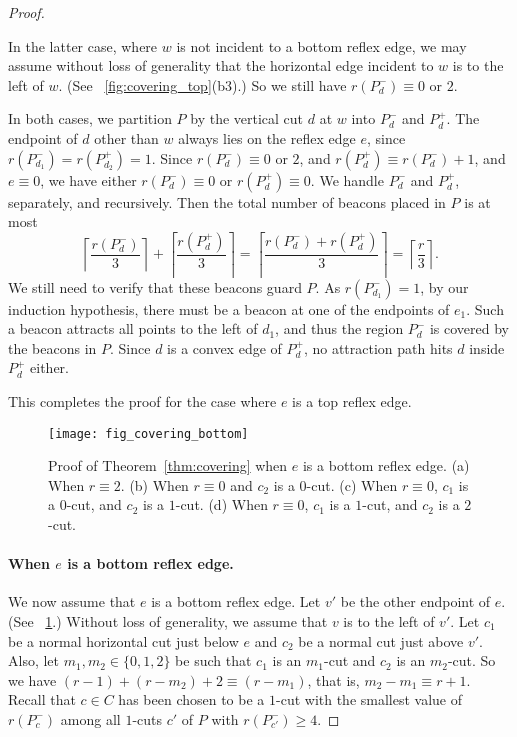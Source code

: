 \documentclass[11pt]{article}
\theoremstyle{definition}
\let\geq\geqslant
\begin{document}
\begin{proof}
\begin{enumerate}[(a)]
\begin{enumerate}[(i)]
 In the latter case, where $w$ is not incident to a bottom reflex edge,
 we may assume without loss of generality that the horizontal edge incident to $w$
 is to the left of $w$. (See \figurename~\ref{fig:covering_top}(b3).)
 So we still have $r(P_d^-) \equiv 0$ or $2$.

 In both cases, we partition $P$ by the vertical cut $d$ at $w$ into $P^-_{d}$ and $P^+_{d}$.
 The endpoint of $d$ other than $w$ always lies on the reflex edge $e$,
 since $r(P^-_{d_1}) = r(P^+_{d_2}) = 1$.
 Since $r(P^-_{d}) \equiv 0$ or $2$, and $r(P^+_{d}) \equiv r(P^-_{d}) + 1$, and
 $e \equiv 0$,
 we have either $r(P^-_{d}) \equiv 0$ or $r(P^+_{d}) \equiv 0$.
 We handle $P^-_{d}$ and $P^+_{d}$, separately, and recursively.
 Then the total number of beacons placed in $P$ is at most
 \[ \left\lceil \frac{r(P^-_{d}) }{3} \right\rceil + \left\lceil \frac{r(P^+_{d}) }{3} \right\rceil
  = \left\lceil \frac{r(P^-_{d}) + r(P^+_{d})}{3} \right\rceil = \left\lceil \frac{r}{3} \right\rceil.\]
 We still need  to verify that these beacons guard $P$.
 As $r(P^-_{d_1})=1$, by our induction hypothesis, there must be a beacon at one of the 
 endpoints of $e_1$.
 Such a beacon attracts all points to the left of $d_1$, and thus
 the region $P^-_{d}$ is covered by the beacons in $P$.
 Since $d$ is a convex edge of $P^+_{d}$, no attraction path hits $d$ inside $P^+_{d}$
 either.
 \end{enumerate}

\end{enumerate}
This completes the proof for the case where $e$ is a top reflex edge.

\begin{figure}[tb]
\centering
\texttt{[image: fig\_covering\_bottom]}
\caption{Proof of Theorem~\ref{thm:covering} when $e$ is a bottom reflex edge.
(a) When $r \equiv 2$.
(b) When $r \equiv 0$ and $c_2$ is a $0$-cut.
(c) When $r \equiv 0$, $c_1$ is a $0$-cut, and $c_2$ is a $1$-cut.
(d) When $r \equiv 0$, $c_1$ is a $1$-cut, and $c_2$ is a $2$-cut. }
\label{fig:covering_bottom}
\end{figure}


\paragraph{When $e$ is a bottom reflex edge.}
We now assume that $e$ is a bottom reflex edge.
Let $v'$ be the other endpoint of $e$. (See \figurename~\ref{fig:covering_bottom}.)
Without loss of generality, we assume that $v$ is to the left of $v'$.
Let $c_1$ be a normal horizontal cut just below $e$ and
$c_2$ be a normal cut just above $v'$.
Also, let $m_1, m_2 \in \{0,1,2\}$ be such that $c_1$ is an $m_1$-cut
and $c_2$ is an $m_2$-cut.
So we have $(r-1) + (r-m_2) + 2 \equiv (r - m_1)$,
that is, $m_2 - m_1 \equiv r + 1$.
Recall that $c\in C$ has been chosen to be a $1$-cut
with the smallest value of $r(P^-_c)$ among all $1$-cuts $c'$ of $P$ with $r(P^-_{c'}) \geq 4$.


\end{proof}
\end{document}
